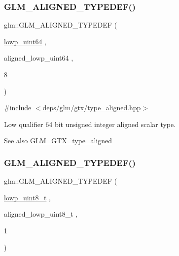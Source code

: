 \subsubsection{\texorpdfstring{G\+L\+M\+\_\+\+A\+L\+I\+G\+N\+E\+D\+\_\+\+T\+Y\+P\+E\+D\+E\+F()}{GLM\_ALIGNED\_TYPEDEF()}\hspace{0.1cm}{\footnotesize\ttfamily [72/209]}}
{\footnotesize\ttfamily glm\+::\+G\+L\+M\+\_\+\+A\+L\+I\+G\+N\+E\+D\+\_\+\+T\+Y\+P\+E\+D\+EF (\begin{DoxyParamCaption}\item[{\hyperlink{group__gtc__type__precision_gacf666a9d9b309c4615c7a4f2ab0be289}{lowp\+\_\+uint64}}]{,  }\item[{aligned\+\_\+lowp\+\_\+uint64}]{,  }\item[{8}]{ }\end{DoxyParamCaption})}



{\ttfamily \#include $<$\hyperlink{gtx_2type__aligned_8hpp}{deps/glm/gtx/type\+\_\+aligned.\+hpp}$>$}

Low qualifier 64 bit unsigned integer aligned scalar type. \begin{DoxySeeAlso}{See also}
\hyperlink{group__gtx__type__aligned}{G\+L\+M\+\_\+\+G\+T\+X\+\_\+type\+\_\+aligned} 
\end{DoxySeeAlso}
\mbox{\label{group__gtx__type__aligned_ga0ba26b4e3fd9ecbc25358efd68d8a4ca}} 
\subsubsection{\texorpdfstring{G\+L\+M\+\_\+\+A\+L\+I\+G\+N\+E\+D\+\_\+\+T\+Y\+P\+E\+D\+E\+F()}{GLM\_ALIGNED\_TYPEDEF()}\hspace{0.1cm}{\footnotesize\ttfamily [73/209]}}
{\footnotesize\ttfamily glm\+::\+G\+L\+M\+\_\+\+A\+L\+I\+G\+N\+E\+D\+\_\+\+T\+Y\+P\+E\+D\+EF (\begin{DoxyParamCaption}\item[{\hyperlink{group__gtc__type__precision_ga0910ef24195d1b8b26e34d73148c0c45}{lowp\+\_\+uint8\+\_\+t}}]{,  }\item[{aligned\+\_\+lowp\+\_\+uint8\+\_\+t}]{,  }\item[{1}]{ }\end{DoxyParamCaption})}



